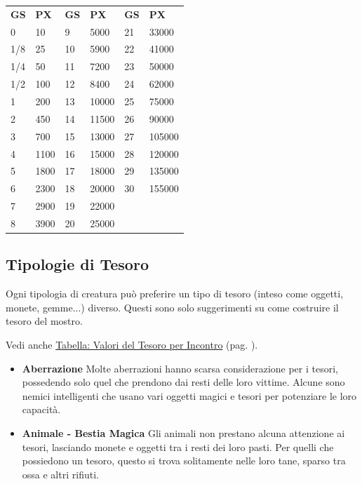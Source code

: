 \begin{multicols}{2}
\medskip

\begin{tabularx}{0.42\textwidth}{ll|ll|ll}

\textbf{GS} & \textbf{PX} &\textbf{GS} & \textbf{PX} &\textbf{GS} & \textbf{PX}\\
0& 10 &9& 5000& 21&33000\\
1/8& 25 &10& 5900&22&41000\\
1/4& 50 &11& 7200&23&50000\\
1/2& 100 &12& 8400&24&62000\\
1& 200 &13& 10000&25&75000\\
2& 450&14& 11500&26&90000\\
3& 700&15& 13000&27&105000\\
4& 1100&16& 15000&28&120000\\
5& 1800&17& 18000&29&135000\\
6& 2300&18& 20000&30&155000\\
7& 2900&19& 22000&&\\
8& 3900&20& 25000&&
\end{tabularx}

\subsection{Tipologie di Tesoro}

Ogni tipologia di creatura può preferire un tipo di tesoro (inteso come oggetti, monete, gemme...) diverso. Questi sono solo suggerimenti su come costruire il tesoro del mostro.

Vedi anche \hyperlink{valoretesoroincontro}{Tabella: Valori del Tesoro per Incontro} (pag. \pageref{valoretesoroincontro}).

\medskip

\begin{itemize}[leftmargin=*] \setlength{\itemsep}{0pt}
	
	\item \textbf{Aberrazione}
	Molte aberrazioni hanno scarsa considerazione per i tesori, possedendo solo quel che prendono dai resti delle loro vittime. Alcune sono nemici intelligenti che usano vari oggetti magici e tesori per potenziare le loro capacità.
	
	\item \textbf{Animale - Bestia Magica} Gli animali non prestano alcuna attenzione ai tesori, lasciando monete e oggetti tra i resti dei loro pasti. Per quelli che possiedono un tesoro, questo si trova solitamente nelle loro tane, sparso tra ossa e altri rifiuti.
	

\end{itemize}
\end{multicols}
